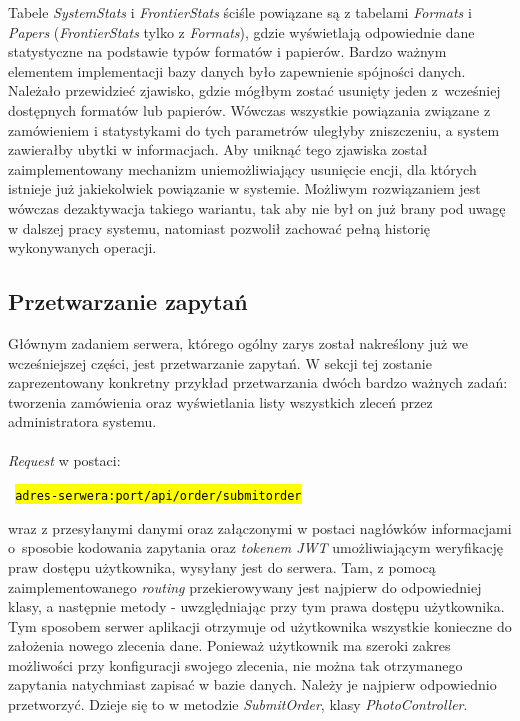 \noindent Tabele \textit{SystemStats} i \textit{FrontierStats} ściśle powiązane są z tabelami \textit{Formats} i \textit{Papers} (\textit{FrontierStats} tylko z \textit{Formats}), gdzie wyświetlają odpowiednie dane statystyczne na podstawie typów formatów i papierów. Bardzo ważnym elementem implementacji bazy danych było zapewnienie spójności danych. Należało przewidzieć zjawisko, gdzie mógłbym zostać usunięty jeden z~wcześniej dostępnych formatów lub papierów. Wówczas wszystkie powiązania związane z zamówieniem i statystykami do tych parametrów uległyby zniszczeniu, a system zawierałby ubytki w informacjach. Aby uniknąć tego zjawiska został zaimplementowany mechanizm uniemożliwiający usunięcie encji, dla których istnieje już jakiekolwiek powiązanie w systemie. Możliwym rozwiązaniem jest wówczas dezaktywacja takiego wariantu, tak aby nie był on już brany pod uwagę w dalszej pracy systemu, natomiast pozwolił zachować pełną historię wykonywanych operacji.
\newpage

\vspace*{0.01\baselineskip}

\subsection{Przetwarzanie zapytań}
\quad Głównym zadaniem serwera, którego ogólny zarys został nakreślony już we wcześniejszej części, jest przetwarzanie zapytań. W sekcji tej zostanie zaprezentowany konkretny przykład przetwarzania dwóch bardzo ważnych zadań: tworzenia zamówienia oraz wyświetlania listy wszystkich zleceń przez administratora systemu.\\
\\
\textit{Request} w postaci:

\vspace{2mm}

    \centerline{\texttt{\hl{ adres-serwera:port/api/order/submitorder }}}

\vspace{2mm}

\noindent wraz z przesyłanymi danymi oraz załączonymi w postaci nagłówków informacjami o~sposobie kodowania zapytania oraz \textit{tokenem JWT} umożliwiającym weryfikację praw dostępu użytkownika, wysyłany jest do serwera. Tam, z pomocą zaimplementowanego \textit{routing} przekierowywany jest najpierw do odpowiedniej klasy, a następnie metody - uwzględniając przy tym prawa dostępu użytkownika.\\
Tym sposobem serwer aplikacji otrzymuje od użytkownika wszystkie konieczne do założenia nowego zlecenia dane. Ponieważ użytkownik ma szeroki zakres możliwości przy konfiguracji swojego zlecenia, nie można tak otrzymanego zapytania natychmiast zapisać w bazie danych. Należy je najpierw odpowiednio przetworzyć. Dzieje się to w metodzie \textit{SubmitOrder}, klasy \textit{PhotoController}. 

